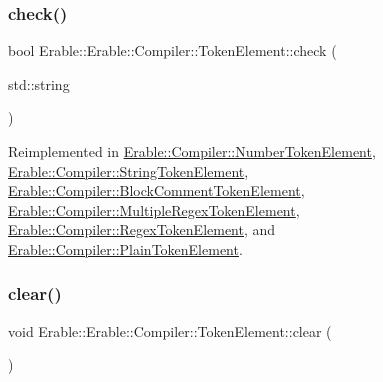 \subsubsection{\texorpdfstring{check()}{check()}}
{\footnotesize\ttfamily bool Erable\+::\+Erable\+::\+Compiler\+::\+Token\+Element\+::check (\begin{DoxyParamCaption}\item[{std\+::string}]{ }\end{DoxyParamCaption})\hspace{0.3cm}{\ttfamily [virtual]}}



Reimplemented in \mbox{\hyperlink{class_erable_1_1_compiler_1_1_number_token_element_afcf6c322af0c870ac0ac47229cb4c248}{Erable\+::\+Compiler\+::\+Number\+Token\+Element}}, \mbox{\hyperlink{class_erable_1_1_compiler_1_1_string_token_element_a25c4ee04b4aac868110d5a7d6fa6e965}{Erable\+::\+Compiler\+::\+String\+Token\+Element}}, \mbox{\hyperlink{class_erable_1_1_compiler_1_1_block_comment_token_element_ac659ec24cb21bae5b4985f8d9c23d2cb}{Erable\+::\+Compiler\+::\+Block\+Comment\+Token\+Element}}, \mbox{\hyperlink{class_erable_1_1_compiler_1_1_multiple_regex_token_element_a1896853055f44c41b3926930049be2c3}{Erable\+::\+Compiler\+::\+Multiple\+Regex\+Token\+Element}}, \mbox{\hyperlink{class_erable_1_1_compiler_1_1_regex_token_element_acfd2c3aed9ab516144e6d98b8ce5690d}{Erable\+::\+Compiler\+::\+Regex\+Token\+Element}}, and \mbox{\hyperlink{class_erable_1_1_compiler_1_1_plain_token_element_a84f12d7d773c70712b30827eae60caed}{Erable\+::\+Compiler\+::\+Plain\+Token\+Element}}.

\mbox{\label{class_erable_1_1_compiler_1_1_token_element_a87d2fb14a2920a914fb5aee33324ab9a}} 
\subsubsection{\texorpdfstring{clear()}{clear()}}
{\footnotesize\ttfamily void Erable\+::\+Erable\+::\+Compiler\+::\+Token\+Element\+::clear (\begin{DoxyParamCaption}{ }\end{DoxyParamCaption})\hspace{0.3cm}{\ttfamily [virtual]}}



